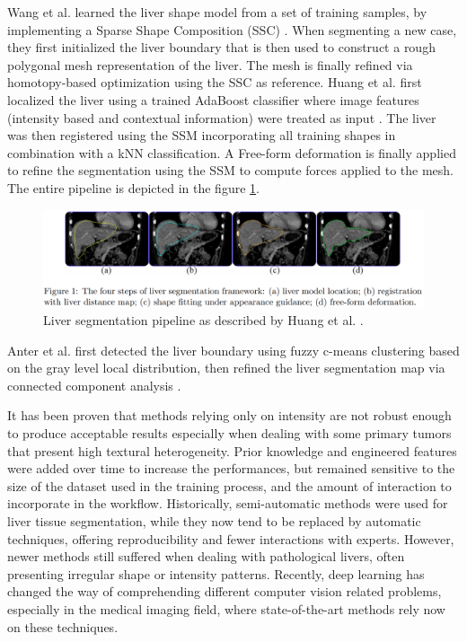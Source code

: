 \documentclass[]{article}
\begin{document}
	Wang et al. learned the liver shape model from a set of training
	samples, by implementing a Sparse Shape Composition (SSC) \cite{Wang2015b}. When
	segmenting a new case, they first initialized the liver boundary that is
	then used to construct a rough polygonal mesh representation of the
	liver. The mesh is finally refined via homotopy-based optimization using
	the SSC as reference.
	Huang et al. first localized the liver using a trained AdaBoost
	classifier where image features (intensity based and contextual
	information) were treated as input \cite{Huang2014}. The liver was then registered using
	the SSM incorporating all training shapes in combination with a kNN
	classification. A Free-form deformation is finally applied to refine the
	segmentation using the SSM to compute forces applied to the mesh. The
	entire pipeline is depicted in the figure \ref{Huang2014_Fig1}.
	
	\begin{figure}[th!]
		\centering
		\includegraphics[width=0.7\linewidth]{images/image9}
		\caption{Liver segmentation pipeline as described by Huang et al. \cite{Huang2014}.}
		\label{Huang2014_Fig1}
	\end{figure}
	
	
	Anter et al. first detected the liver boundary using fuzzy c-means
	clustering based on the gray level local distribution, then refined the
	liver segmentation map via connected component analysis \cite{Anter2014}.
	
	It has been proven that methods relying only on intensity are not robust
	enough to produce acceptable results especially when dealing with some
	primary tumors that present high textural heterogeneity. Prior knowledge
	and engineered features were added over time to increase the
	performances, but remained sensitive to the size of the dataset used in
	the training process, and the amount of interaction to incorporate in
	the workflow.
	Historically, semi-automatic methods were used for liver tissue
	segmentation, while they now tend to be replaced by automatic
	techniques, offering reproducibility and fewer interactions with
	experts. However, newer methods still suffered when dealing with
	pathological livers, often presenting irregular shape or intensity
	patterns.
	Recently, deep learning has changed the way of comprehending different
	computer vision related problems, especially in the medical imaging
	field, where state-of-the-art methods rely now on these techniques.
	
\end{document}

